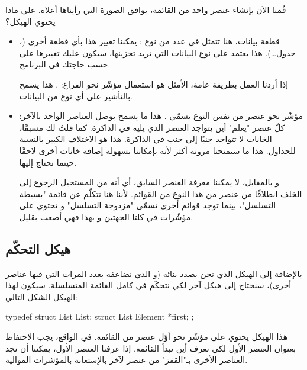 قُمنا الآن بإنشاء عنصر واحد من القائمة، يوافق الصورة التي رأيناها أعلاه. على ماذا يحتوي الهيكل؟

\begin{itemize}
	\item قطعة بيانات، هنا تتمثل في عدد من نوع 
	:
	يمكننا تغيير هذا بأي قطعة أخرى
	(،
	جدول\dots). هذا يعتمد على نوع البيانات التي تريد تخزينها، سيكون عليك تغييرها على حسب حاجتك في البرنامج.
	
	\begin{information}
		إذا أردنا العمل بطريقة عامة، الأمثل هو استعمال مؤشّر نحو الفراغ:
		.
		هذا يسمح بالتأشير على أي نوع من البيانات.
	\end{information}
	\item مؤشّر نحو عنصر من نفس النوع يسمّى
	\InlineCode{next}.
	هذا ما يسمح بوصل العناصر الواحد بالآخر: كلّ عنصر "يعلم" أين يتواجد العنصر الذي يليه في الذاكرة. كما قلتُ لك مسبقًا، الخانات لا تتواجد جنبًا إلى جنب في الذاكرة. هذا هو الاختلاف الكبير بالنسبة للجداول. هذا ما سيمنحنا مرونة أكثر لأنه بإمكاننا بسهولة إضافة خانات أخرى لاحقًا حينما نحتاج إليها.

\begin{information}
	و بالمقابل، لا يمكننا معرفة العنصر السابق، أي أنه من المستحيل الرجوع إلى الخلف انطلاقًا من عنصر من هذا النوع من القوائم. لأننا هنا نتكلّم عن قائمة "بسيطة التسلسل"، بينما توجد قوائم أخرى تسمّى "مزدوجة التسلسل" و تحتوي على مؤشّرات في كلتا الجهتين و بهذا فهي أصعب بقليل.
\end{information}
\end{itemize}


\subsection{هيكل التحكّم}

بالإضافة إلى الهيكل الذي نحن بصدد بنائه (و الذي نضاعفه بعدد المرات التي فيها عناصر أخرى)، سنحتاج إلى هيكل آخر لكي نتحكّم في كامل القائمة المتسلسلة. سيكون لهذا الهيكل الشكل التالي:

\begin{Csource}
typedef struct List List;
struct List
{
	Element *first;
};
\end{Csource}

هذا الهيكل
يحتوي على مؤشّر نحو أوّل عنصر من القائمة. في الواقع، يجب الاحتفاظ بعنوان العنصر الأول لكي نعرف أين تبدأ القائمة. إذا عرفنا العنصر الأول، يمكننا أن نجد العناصر الأخرى بـ"القفز" من عنصر لآخر بالإستعانة بالمؤشرات الموالية.


